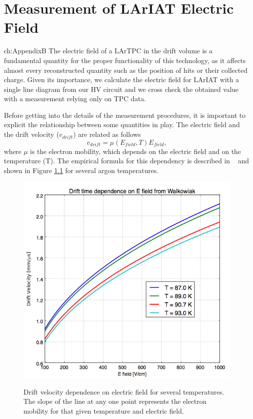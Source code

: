 \chapter{Measurement of LArIAT Electric Field}{ch:AppendixB}
The electric field of a LArTPC in the drift volume is a fundamental quantity for the proper functionality of this technology, as it affects almost every reconstructed quantity such as the position of hits or their collected charge. Given its importance, we calculate the electric field for LArIAT with a single line diagram from our HV circuit and we cross check the obtained value with a measurement relying only on TPC data. 

Before getting into the details of the measurement procedures, it is important to explicit the relationship between some  quantities in play. The electric field and the drift velocity ($v_{drift}$) are related as follows 
\begin{equation} v_{drift} = \mu(E_{field},T) E_{field}, \label{eq:vd}
\end{equation}
where $\mu$ is the electron mobility, which depends on the electric field and on the temperature (T). The empirical formula for this dependency is described in ~\cite{WWW} and shown in Figure \ref{fig:EV} for several argon temperatures.

\begin{figure}[htb]
\centering
\includegraphics[scale=0.45]{./AppendixB-EField/Images/Walkowiak.png}\\
\caption{Drift velocity dependence on electric field for several temperatures. The slope of the line at any one point represents the electron mobility for that given temperature and electric field.}
\label{fig:EV}
\end{figure}



